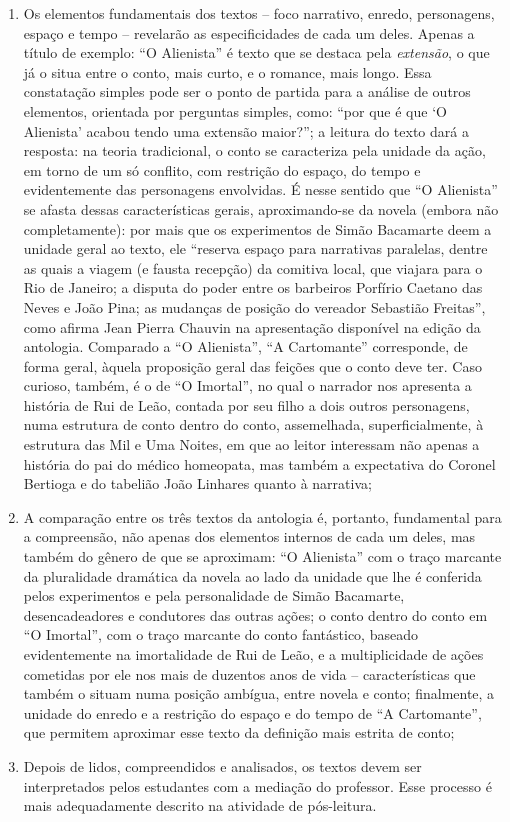 \documentclass{extarticle}
\begin{document}
\begin{enumerate}
\item Os elementos fundamentais dos textos -- foco narrativo, enredo,
personagens, espaço e tempo -- revelarão as especificidades de cada um
deles. Apenas a título de exemplo: ``O Alienista'' é texto que se
destaca pela \emph{extensão}, o que já o situa entre o conto, mais
curto, e o romance, mais longo. Essa constatação simples pode ser o
ponto de partida para a análise de outros elementos, orientada por
perguntas simples, como: ``por que é que `O Alienista' acabou tendo uma
extensão maior?''; a leitura do texto dará a resposta: na teoria
tradicional, o conto se caracteriza pela unidade da ação, em torno de um
só conflito, com restrição do espaço, do tempo e evidentemente das
personagens envolvidas. É nesse sentido que ``O Alienista'' se afasta
dessas características gerais, aproximando-se da novela (embora não
completamente): por mais que os experimentos de Simão Bacamarte deem a
unidade geral ao texto, ele ``reserva espaço para narrativas paralelas,
dentre as quais a viagem (e fausta recepção) da comitiva local, que
viajara para o Rio de Janeiro; a disputa do poder entre os barbeiros
Porfírio Caetano das Neves e João Pina; as mudanças de posição do
vereador Sebastião Freitas'', como afirma Jean Pierra Chauvin na
apresentação disponível na edição da antologia. Comparado a ``O
Alienista'', ``A Cartomante'' corresponde, de forma geral, àquela
proposição geral das feições que o conto deve ter. Caso curioso, também,
é o de ``O Imortal'', no qual o narrador nos apresenta a história de Rui
de Leão, contada por seu filho a dois outros personagens, numa estrutura
de conto dentro do conto, assemelhada, superficialmente, à estrutura das
Mil e Uma Noites, em que ao leitor interessam não apenas a história do
pai do médico homeopata, mas também a expectativa do Coronel Bertioga e
do tabelião João Linhares quanto à narrativa;

\item A comparação entre os três textos da antologia é, portanto,
fundamental para a compreensão, não apenas dos elementos internos de
cada um deles, mas também do gênero de que se aproximam: ``O Alienista''
com o traço marcante da pluralidade dramática da novela ao lado da
unidade que lhe é conferida pelos experimentos e pela personalidade de
Simão Bacamarte, desencadeadores e condutores das outras ações; o conto
dentro do conto em ``O Imortal'', com o traço marcante do conto
fantástico, baseado evidentemente na imortalidade de Rui de Leão, e a
multiplicidade de ações cometidas por ele nos mais de duzentos anos de
vida -- características que também o situam numa posição ambígua, entre
novela e conto; finalmente, a unidade do enredo e a restrição do espaço
e do tempo de ``A Cartomante'', que permitem aproximar esse texto da
definição mais estrita de conto;

\item Depois de lidos, compreendidos e analisados, os textos devem ser
interpretados pelos estudantes com a mediação do professor. Esse
processo é mais adequadamente descrito na atividade de pós-leitura.
\end{enumerate}
\end{document}

